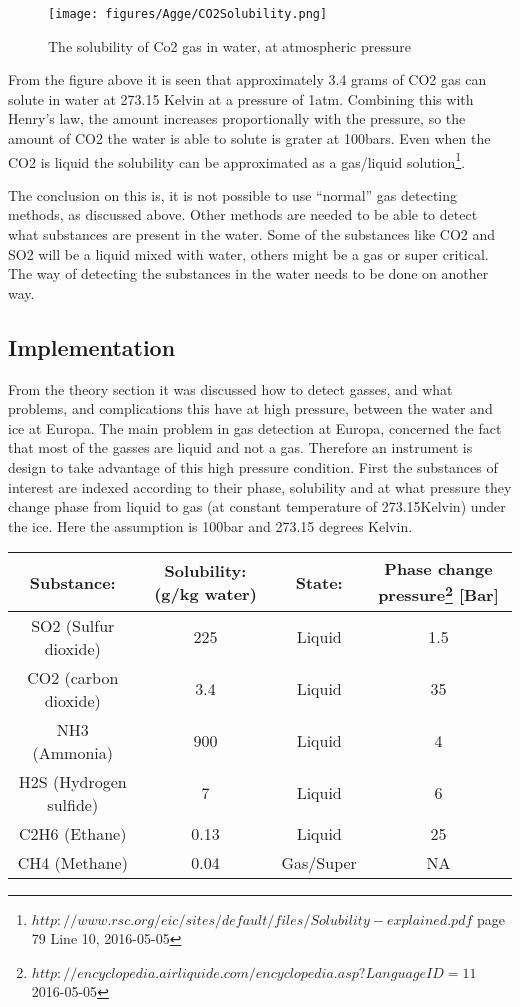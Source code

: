 \documentclass[10pt,a4paper,draft]{report}
\begin{document}
\begin{figure}[H]
\caption{The solubility of Co2 gas in water, at atmospheric pressure}
\centering
\texttt{[image: figures/Agge/CO2Solubility.png]}  
\end{figure}

From the figure above it is seen that approximately 3.4 grams of CO2 gas can solute in water at 273.15 Kelvin at a pressure of 1atm. Combining this with Henry’s law, the amount increases proportionally with the pressure, so the amount of CO2 the water is able to solute is grater at 100bars. Even when the CO2 is liquid the solubility can be approximated as a gas/liquid solution\footnote{$http://www.rsc.org/eic/sites/default/files/Solubility-explained.pdf$ page 79 Line 10, 2016-05-05}. \par
The conclusion on this is, it is not possible to use “normal” gas detecting methods, as discussed above. Other methods are needed to be able to detect what substances are present in the water. Some of the substances like CO2 and SO2 will be a liquid mixed with water, others might be a gas or super critical. The way of detecting the substances in the water needs to be done on another way.\par

\subsection{Implementation}
From the theory section it was discussed how to detect gasses, and what problems, and complications this have at high pressure, between the water and ice at Europa. The main problem in gas detection at Europa, concerned the fact that most of the gasses are liquid and not a gas. Therefore an instrument is design to take advantage of this high pressure condition. First the substances of interest are indexed according to their phase, solubility and at what pressure they change phase from liquid to gas (at constant temperature of 273.15Kelvin) under the ice. Here the assumption is 100bar and 273.15 degrees Kelvin.

\begin{center}
\begin{tabular}{ |c | c | c | c| }
\hline
 Substance: & Solubility: (g/kg water) & State: & Phase change pressure\footnote{$http://encyclopedia.airliquide.com/encyclopedia.asp?LanguageID=11$ 2016-05-05} [Bar] \\ [0.5ex]  
\hline
SO2 (Sulfur dioxide) & 225 & Liquid & 1.5\\ 
\hline
CO2 (carbon dioxide) & 3.4 & Liquid & 35\\ 
\hline
NH3 (Ammonia) & 900 & Liquid & 4\\ 
\hline
H2S (Hydrogen sulfide) & 7 & Liquid & 6\\
\hline
C2H6 (Ethane) & 0.13 & Liquid & 25\\
\hline
CH4 (Methane) & 0.04 & Gas/Super & NA\\
\hline
\end{tabular}
\end{center}
\end{document}
